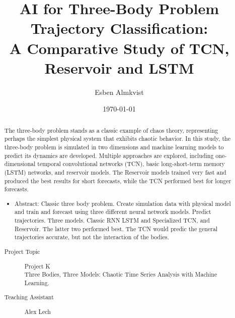 \documentclass[%
 reprint,
 amsmath,amssymb,
 aps,
]{revtex4-2}
\begin{document}
\title{AI for Three-Body Problem Trajectory Classification: \\
A Comparative Study of TCN, Reservoir and LSTM}

\author{Esben Almkvist}


\date{\today}%

\begin{abstract} %
\noindent The three-body problem stands as a classic example of chaos theory, representing perhaps the simplest physical system that exhibits chaotic behavior. In this study, the three-body problem is simulated in two dimensions and machine learning models to predict its dynamics are developed. Multiple approaches are explored, including one-dimensional temporal convolutional networks (TCN), basic long-short-term memory (LSTM) networks, and reservoir models. The Reservoir models trained very fast and produced the best results for short forecasts, while the TCN performed best for longer forecasts.  

\begin{itemize}
    \item Abstract: Classic three body problem. Create simulation data with physical model and train and forecast using three different neural network models. Predict trajectories. Three models. Classic RNN LSTM and Specialized TCN, and Reservoir. The latter two performed best. The TCN would predic the general trajectories accurate, but not the interaction of the bodies.
\end{itemize}


\begin{description} %
\item[Project Topic] %
{Project K\\
Three Bodies, Three Models: Chaotic Time Series Analysis with Machine
Learning.} %
\item[Teaching Assistant] %
{Alex Lech} %
\end{description} %
\end{abstract}

\maketitle
\end{document}
